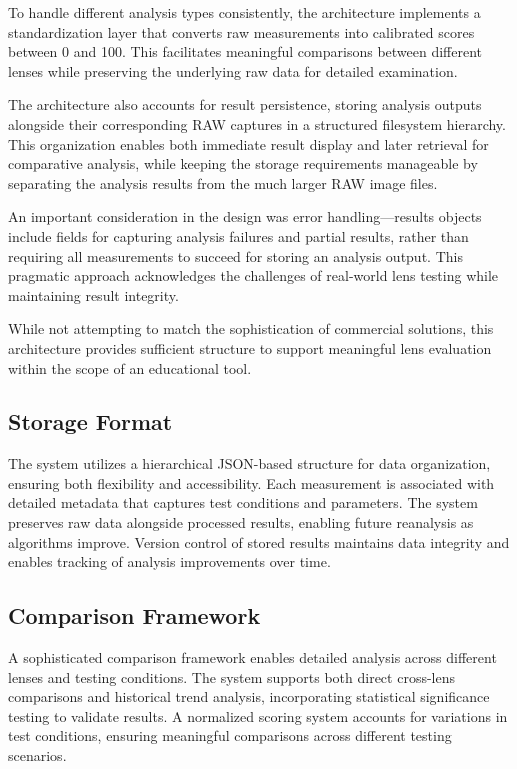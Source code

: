 To handle different analysis types consistently, the architecture implements a standardization layer that converts raw measurements into calibrated scores between 0 and 100. This facilitates meaningful comparisons between different lenses while preserving the underlying raw data for detailed examination.

The architecture also accounts for result persistence, storing analysis outputs alongside their corresponding RAW captures in a structured filesystem hierarchy. This organization enables both immediate result display and later retrieval for comparative analysis, while keeping the storage requirements manageable by separating the analysis results from the much larger RAW image files.

An important consideration in the design was error handling---results objects include fields for capturing analysis failures and partial results, rather than requiring all measurements to succeed for storing an analysis output. This pragmatic approach acknowledges the challenges of real-world lens testing while maintaining result integrity.

While not attempting to match the sophistication of commercial solutions, this architecture provides sufficient structure to support meaningful lens evaluation within the scope of an educational tool.

\subsection{Storage Format}
The system utilizes a hierarchical JSON-based structure for data organization, ensuring both flexibility and accessibility. Each measurement is associated with detailed metadata that captures test conditions and parameters. The system preserves raw data alongside processed results, enabling future reanalysis as algorithms improve. Version control of stored results maintains data integrity and enables tracking of analysis improvements over time.

\subsection{Comparison Framework}
A sophisticated comparison framework enables detailed analysis across different lenses and testing conditions. The system supports both direct cross-lens comparisons and historical trend analysis, incorporating statistical significance testing to validate results. A normalized scoring system accounts for variations in test conditions, ensuring meaningful comparisons across different testing scenarios.

